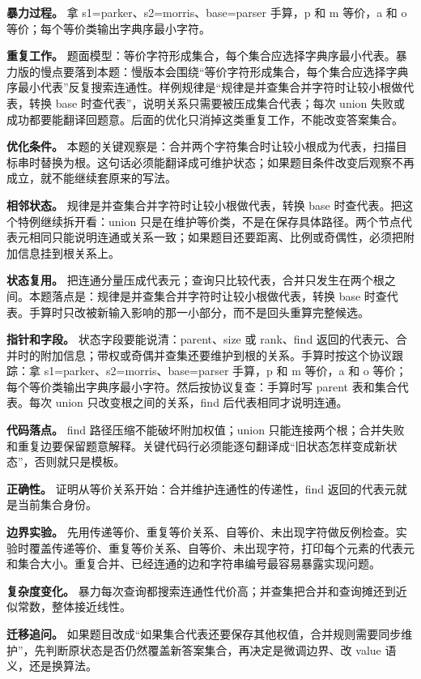 \textbf{暴力过程。} 拿 s1=parker、s2=morris、base=parser 手算，p 和 m 等价，a 和 o 等价；每个等价类输出字典序最小字符。

\textbf{重复工作。} 题面模型：等价字符形成集合，每个集合应选择字典序最小代表。暴力版的慢点要落到本题：慢版本会围绕“等价字符形成集合，每个集合应选择字典序最小代表”反复搜索连通性。样例规律是“规律是并查集合并字符时让较小根做代表，转换 base 时查代表”，说明关系只需要被压成集合代表；每次 union 失败或成功都要能翻译回题意。后面的优化只消掉这类重复工作，不能改变答案集合。

\textbf{优化条件。} 本题的关键观察是：合并两个字符集合时让较小根成为代表，扫描目标串时替换为根。这句话必须能翻译成可维护状态；如果题目条件改变后观察不再成立，就不能继续套原来的写法。

\textbf{相邻状态。} 规律是并查集合并字符时让较小根做代表，转换 base 时查代表。把这个特例继续拆开看：union 只是在维护等价类，不是在保存具体路径。两个节点代表元相同只能说明连通或关系一致；如果题目还要距离、比例或奇偶性，必须把附加信息挂到根关系上。

\textbf{状态复用。} 把连通分量压成代表元；查询只比较代表，合并只发生在两个根之间。本题落点是：规律是并查集合并字符时让较小根做代表，转换 base 时查代表。手算时只改被新输入影响的那一小部分，而不是回头重算完整候选。

\textbf{指针和字段。} 状态字段要能说清：parent、size 或 rank、find 返回的代表元、合并时的附加信息；带权或奇偶并查集还要维护到根的关系。手算时按这个协议跟踪：拿 s1=parker、s2=morris、base=parser 手算，p 和 m 等价，a 和 o 等价；每个等价类输出字典序最小字符。然后按协议复查：手算时写 parent 表和集合代表。每次 union 只改变根之间的关系，find 后代表相同才说明连通。

\textbf{代码落点。} find 路径压缩不能破坏附加权值；union 只能连接两个根；合并失败和重复边要保留题意解释。关键代码行必须能逐句翻译成“旧状态怎样变成新状态”，否则就只是模板。

\textbf{正确性。} 证明从等价关系开始：合并维护连通性的传递性，find 返回的代表元就是当前集合身份。

\textbf{边界实验。} 先用传递等价、重复等价关系、自等价、未出现字符做反例检查。实验时覆盖传递等价、重复等价关系、自等价、未出现字符，打印每个元素的代表元和集合大小。重复合并、已经连通的边和字符串编号最容易暴露实现问题。

\textbf{复杂度变化。} 暴力每次查询都搜索连通性代价高；并查集把合并和查询摊还到近似常数，整体接近线性。

\textbf{迁移追问。} 如果题目改成“如果集合代表还要保存其他权值，合并规则需要同步维护”，先判断原状态是否仍然覆盖新答案集合，再决定是微调边界、改 value 语义，还是换算法。

